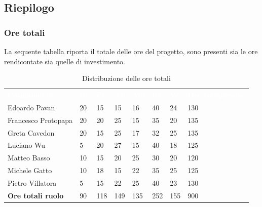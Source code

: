 \subsection{Riepilogo}
\subsubsection{Ore totali}
La sequente tabella riporta il totale delle ore del progetto, sono presenti sia le ore rendicontate sia quelle di investimento.

\begin{table}[H]
	\begin{center}
	\renewcommand{\arraystretch}{1.25}
	\begin{tabular}{ m{}<{\centering}  m{}<{\centering} m{}<{\centering} m{}<{\centering}  m{}<{\centering}  m{}<{\centering}  m{}<{\centering}  m{}<{\centering}   }
		\rowcolor{darkblue}
		\textcolor{white}{\textbf{Componente}} &\textcolor{white}{\textbf{Re}}&\textcolor{white}{\textbf{Pt}}&\textcolor{white}{\textbf{An}}&\textcolor{white}{\textbf{Am}}&\textcolor{white}{\textbf{Pr}}&\textcolor{white}{\textbf{Ve}}&\textcolor{white}{\textbf{Ore complessive}}\\ 
		Edoardo Pavan & 20 & 15 & 15 & 16 & 40 & 24 & 130 \\	
		
		Francesco Protopapa & 20 & 20 & 25 & 15 & 35 & 20 & 135 \\
	
		Greta Cavedon & 20 & 15 & 25 & 17 & 32 & 25 & 135 \\
		
		Luciano Wu & 5 & 20 & 27 & 15 & 40 & 18 & 125 \\
		
		Matteo Basso & 10 & 15 & 20 & 25 & 30 & 20 & 120 \\
		
		Michele Gatto & 10 & 18 & 15 & 22 & 35 & 25 & 125 \\
		
		Pietro Villatora & 5 & 15 & 22 & 25 & 40 & 23 & 130 \\
		
		\textbf{Ore totali ruolo} & 90 & 118 & 149 & 135 & 252 & 155 & 900 \\
	
\end{tabular}
\caption{Distribuzione delle ore totali}
\end{center}
\end{table}

